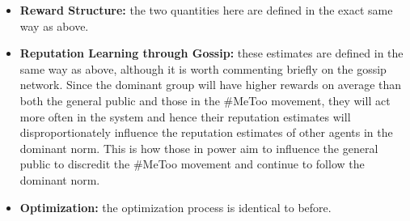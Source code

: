 \documentclass[12pt]{article}
\begin{document}
\begin{itemize}
\begin{align*}
\begin{cases}
            < 0 & a \approx \sigma_r \\
            > 0 & a \approx \sigma_f
        \end{cases}
    \end{align*}
    the intuition being that those in power benefit greatly from their schema,
    but during a successful resistance they would suffer due to public shaming and loss
    of credibility. However, once the resistance has overturned the dominant schema,
    those in power can reintegrate into society but with moderate rewards and lower reputation
    due to the negative image they have accumulated.
    If $i \in G_n$
    \begin{align*}
        u_i(s, a) = \begin{cases}
            > 0 & a \approx \sigma_d \\
            > 0 & a \approx \sigma_r \\
            > 0 & a \approx \sigma_f
        \end{cases}
    \end{align*}
    here the idea is that the general public is mostly unaffected by the conflict
    between those in power and the \#MeToo movement.
    Finally, if $i \in G_r$
    \begin{align*}
        u_i(s, a) = \begin{cases}
            \ll 0 & a \approx \sigma_d \\
            \gg 0 & a \approx \sigma_r \\
            > 0 & a \approx \sigma_f
        \end{cases}
    \end{align*}
    her the intuition is that, in the dominant norm the individuals the \#MeToo movement
    stand for are negatively affected. Thus, during a successful resistance they would
    see large benefits as their suffering is acknowledged and those who caused harm to them are punished.
    Finally, once the resistant norm becomes the dominant one, those who once suffered will
    now function as normal members of society with moderate rewards in these social situations.
    \item \textbf{Reward Structure:} the two quantities here are defined in the exact same way as above.

    \item \textbf{Reputation Learning through Gossip:} these estimates are defined in the same way as above,
    although it is worth commenting briefly on the gossip network. Since the dominant group will have higher rewards
    on average than both the general public and those in the \#MeToo movement, they will act more often in the system
    and hence their reputation estimates will disproportionately influence the reputation
    estimates of other agents in the dominant norm. This is how those in power aim to influence the general
    public to discredit the \#MeToo movement and continue to follow the dominant norm.

    \item \textbf{Optimization:} the optimization process is identical to before.
\end{itemize}
\end{document}
